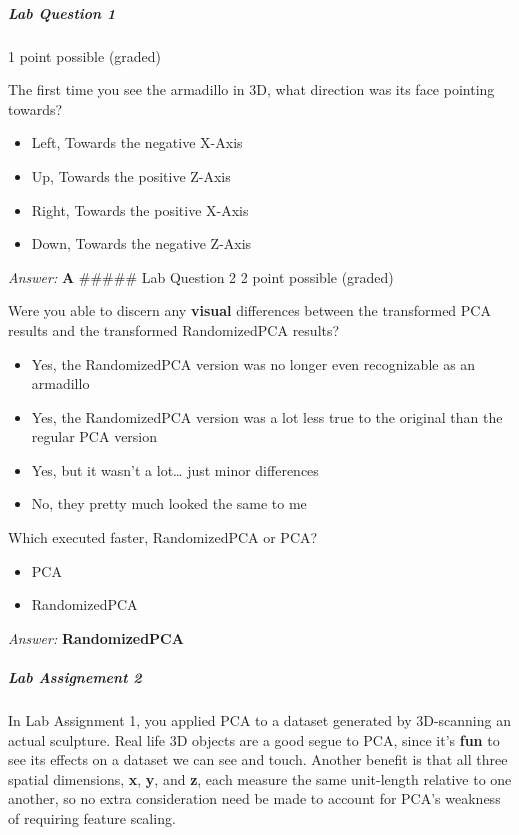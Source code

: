 \documentclass[11pt]{article}
\providecommand{\tightlist}{%
      \setlength{\itemsep}{0pt}\setlength{\parskip}{0pt}}
\begin{document}
\hypertarget{lab-question-1}{%
\subparagraph{Lab Question 1}\label{lab-question-1}}

1 point possible (graded)

The first time you see the armadillo in 3D, what direction was its face
pointing towards?

\begin{itemize}
\tightlist
\item
  Left, Towards the negative X-Axis
\item
  Up, Towards the positive Z-Axis
\item
  Right, Towards the positive X-Axis
\item
  Down, Towards the negative Z-Axis
\end{itemize}

\emph{Answer:} \textbf{A} \#\#\#\#\# Lab Question 2 2 point possible
(graded)

Were you able to discern any \textbf{visual} differences between the
transformed PCA results and the transformed RandomizedPCA results?

\begin{itemize}
\tightlist
\item
  Yes, the RandomizedPCA version was no longer even recognizable as an
  armadillo
\item
  Yes, the RandomizedPCA version was a lot less true to the original
  than the regular PCA version
\item
  Yes, but it wasn't a lot\ldots{} just minor differences
\item
  No, they pretty much looked the same to me
\end{itemize}

Which executed faster, RandomizedPCA or PCA?

\begin{itemize}
\tightlist
\item
  PCA
\item
  RandomizedPCA
\end{itemize}

\emph{Answer:} \textbf{RandomizedPCA}

\hypertarget{lab-assignement-2}{%
\subparagraph{Lab Assignement 2}\label{lab-assignement-2}}

In Lab Assignment 1, you applied PCA to a dataset generated by
3D-scanning an actual sculpture. Real life 3D objects are a good segue
to PCA, since it's \textbf{fun} to see its effects on a dataset we can
see and touch. Another benefit is that all three spatial dimensions,
\textbf{x}, \textbf{y}, and \textbf{z}, each measure the same
unit-length relative to one another, so no extra consideration need be
made to account for PCA's weakness of requiring feature scaling.
\end{document}
